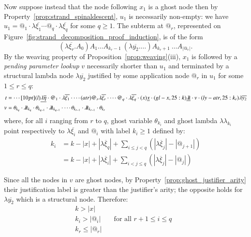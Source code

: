 \documentclass{elsarticle}
\theoremstyle{plain}
\theoremstyle{definition}
\theoremstyle{remark}
\newcommand{\ghostlmd}{{\lambda\!\!\lambda}}
\newcommand{\ghostvar}{\theta}
\begin{document}
\begin{enumerate}
Now suppose instead that the node following $x_1$ is a ghost node then by Property~\ref{prop:strand_spinaldescent}, $u_1$ is necessarily non-empty: we have $u_1 =
@_1 \cdot\lambda\overline{\xi_1} \cdots @_q\cdot \lambda\overline{\xi_q}$ for some $q\geq 1$. The subterm at $@_r$,  represented on Figure~\ref{fig:strand_decomposition_proof_induction}, is of the form
$$(\lambda\overline{\xi_r}. A_0) A_1 \ldots A_{k_{r}-1}\ (\lambda\overline{y_2}. \ldots)A_{k_{r}+1}\ \ldots A_{|@_r|} .$$
By the weaving property of Proposition~\ref{prop:weaving}(iii), $x_1$ is followed by a \emph{pending parameter lookup} $v$ necessarily shorter than $u_1$ and terminated by a structural lambda node $\lambda\overline{y_2}$ justified by some application node $@_r$ in $u_1$ for some $1\leq r \leq q$:
\begin{align*}
 t &= \cdots \Pstr[10pt]{
(l){\underline{\lambda\overline{\eta}}} \cdot
{@_1} \cdot \lambda\overline{\xi_1} \cdot
\cdots
(atr){@_r} \lambda\overline{\xi_r} \cdot
\cdots
{@_q} \cdot\lambda\overline{\xi_q} \cdot
(x){\underline{x}}\cdot
(gl-x,25:k){\underline\ghostlmd}
\cdot v
\cdot
(ly-atr,25:k_r){\lambda\overline{y_2}}
 } \\
v &= \ghostvar_{k_q} \cdot \ghostlmd_{k_q} \cdot
\ghostvar_{k_{q-1}} \cdot \ghostlmd_{k_{q-1}} \cdot
\cdots
\ghostvar_{k_{r-1}} \cdot \ghostlmd_{k_{r-1}} \cdot
\ghostvar_{k_{r}}
\end{align*}
where, for all $i$ ranging from $r$ to $q$, ghost variable
$\ghostvar_{k_i}$ and ghost lambda $\ghostlmd_{k_i}$ point respectively to $\lambda\overline{\xi_i}$ and $@_i$ with label $k_i\geq1$ defined by:
\begin{align*}
  k_i &= k - |x| + |\lambda\overline{\xi}_q| + \sum_{i\leq j < q} (|\lambda\overline{\xi}_{j}| - |@_{j+1}|)
\\
   &= k - |x| +
  |\lambda\overline{\xi}_{i}| +
  \sum_{i< j\leq q} (|\lambda\overline{\xi}_j| - |@_j|)
\end{align*}

Since all the nodes in $v$ are ghost nodes, by Property~\ref{prop:ghost_justifier_arity} their justification label is greater than the justifier's arity; the opposite holds for $\lambda\overline{y_2}$ which is a structural node. Therefore:
\begin{align}
k > |x| \label{eqn:k_greater_than_x} \\
k_i > |@_i| & \quad\mbox{for all $r+1\leq i \leq q$ } \label{eqn:qnfdecomp_kj}\\
k_r \leq |@_r|
\end{align}



\end{enumerate}
\end{document}
